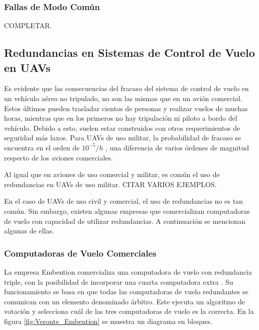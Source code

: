\subsubsection{Fallas de Modo Común}

{\color{red} COMPLETAR}.

\subsection{Redundancias en Sistemas de Control de Vuelo en UAVs}

Es evidente que las consecuencias del fracaso del sistema de control de vuelo en un vehículo aéreo no tripulado, no son las mismas que en un avión comercial. Estos últimos pueden trasladar cientos de personas y realizar vuelos de muchas horas, mientras que en los primeros no hay tripulación ni piloto a bordo del vehículo. Debido a esto, suelen estar construidos con otros requerimientos de seguridad más laxos. Para UAVs de uso militar, la probabilidad de fracaso se encuentra en el orden de $10^{-5} / h$ \cite{zhang2020architecture}\cite[p.~491]{collinson2023introduction}, una diferencia de varios órdenes de magnitud respecto de los aviones comerciales.

Al igual que en aviones de uso comercial y militar, es común el uso de redundancias en UAVs de uso militar. {\color{red} CITAR VARIOS EJEMPLOS}.

En el caso de UAVs de uso civil y comercial, el uso de redundancias no es tan común. Sin embargo, existen algunas empresas que comercializan computadoras de vuelo con capacidad de utilizar redundancias. A continuación se mencionan algunas de ellas.

\subsubsection{Computadoras de Vuelo Comerciales}

La empresa Embention comercializa una computadora de vuelo con redundancia triple, con la posibilidad de incorporar una cuarta computadora extra \cite{embention-2023}. Su funcionamiento se basa en que todas las computadoras de vuelo redundantes se comunican con un elemento denominado árbitro. Este ejecuta un algoritmo de votación y selecciona cuál de las tres computadoras de vuelo es la correcta. En la figura \ref{fig:Veronte_Embention} se muestra un diagrama en bloques.

